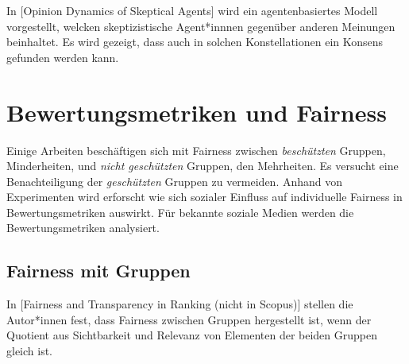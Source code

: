 In [Opinion Dynamics of Skeptical Agents] wird ein agentenbasiertes Modell vorgestellt, welcken skeptizistische Agent*innnen gegenüber anderen Meinungen beinhaltet. Es wird gezeigt, dass auch in solchen Konstellationen ein Konsens gefunden werden kann.

\section{Bewertungsmetriken und Fairness}

Einige Arbeiten beschäftigen sich mit Fairness zwischen \textit{beschützten} Gruppen, Minderheiten, und \textit{nicht geschützten} Gruppen, den Mehrheiten. Es versucht eine Benachteiligung der \textit{geschützten} Gruppen zu vermeiden. Anhand von Experimenten wird erforscht wie sich sozialer Einfluss auf individuelle Fairness in Bewertungsmetriken auswirkt. Für bekannte soziale Medien werden die Bewertungsmetriken analysiert.





\subsection{Fairness mit Gruppen}

In [Fairness and Transparency in Ranking (nicht in Scopus)] stellen die Autor*innen fest, dass Fairness zwischen Gruppen hergestellt ist, wenn der Quotient aus Sichtbarkeit und Relevanz von Elementen der beiden Gruppen gleich ist.

